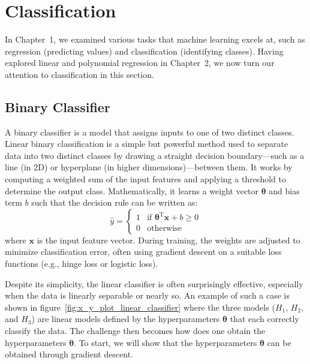 \documentclass[12pt,letter]{article}
\begin{document}
	\setcounter{section}{2}	
	\setcounter{figure}{0}   
	\renewcommand\thefigure{\thesection.\arabic{figure}}
	\setcounter{equation}{\thesection}   
	\renewcommand\theequation{\thesection.\arabic{equation}}

	\section{Classification}

In Chapter~1, we examined various tasks that machine learning excels at, such as regression (predicting values) and classification (identifying classes). Having explored linear and polynomial regression in Chapter~2, we now turn our attention to classification in this section.







\subsection{Binary Classifier}

A binary classifier is a model that assigns inputs to one of two distinct classes.
Linear binary classification is a simple but powerful method used to separate data into two distinct classes by drawing a straight decision boundary---such as a line (in 2D) or hyperplane (in higher dimensions)---between them. It works by computing a weighted sum of the input features and applying a threshold to determine the output class. Mathematically, it learns a weight vector $\boldsymbol{\theta}$ and bias term $b$ such that the decision rule can be written as:
\begin{equation}
\hat{y} = \begin{cases}
1 & \text{if } \boldsymbol{\theta}^\text{T} \mathbf{x} + b \geq 0 \\
0 & \text{otherwise}
\end{cases}
\end{equation}
where $\mathbf{x}$ is the input feature vector. During training, the weights are adjusted to minimize classification error, often using gradient descent on a suitable loss functions (e.g., hinge loss or logistic loss). 

Despite its simplicity, the linear classifier is often surprisingly effective, especially when the data is linearly separable or nearly so. An example of such a case is shown in figure~\ref{fig:x_y_plot_linear_classifier} where the three models ($H_1$, $H_2$, and $H_3$) are linear models defined by the hyperparameters $ \boldsymbol{\theta}$ that each correctly classify the data. The challenge then becomes how does one obtain the hyperparameters $ \boldsymbol{\theta}$. To start, we will show that the hyperparameters $ \boldsymbol{\theta}$ can be obtained through gradient descent.
\end{document}
